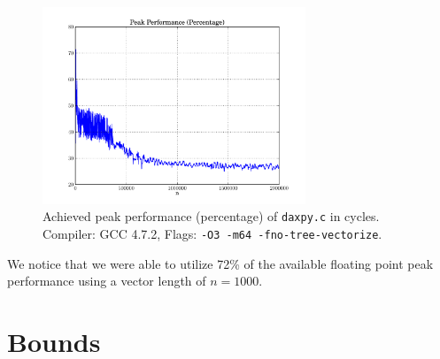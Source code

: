 \documentclass[portrait,a4paper]{article}
\begin{document}
\begin{figure}[H]
\centering
\includegraphics[width=0.7\textwidth]{daxpy/PeakPerformancePercentage.pdf}
\caption{Achieved peak performance (percentage) of \lstinline{daxpy.c} in cycles. Compiler: GCC 4.7.2, Flags: \lstinline{-O3 -m64 -fno-tree-vectorize}.}
\end{figure}

We notice that we were able to utilize 72\% of the available floating point peak performance using a vector length of $n=1000$.

\section{Bounds}
\end{document}
